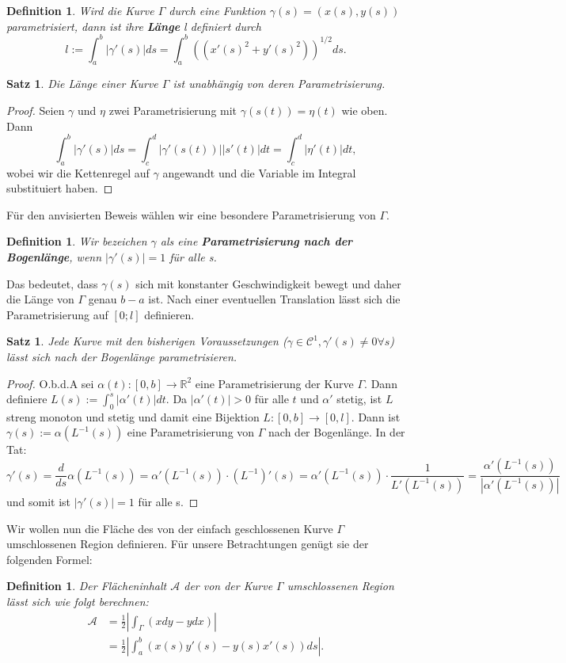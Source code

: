 \documentclass[12pt,a4paper]{article}
\theoremstyle{plain}
\newtheorem{Satz}[Theorem]{Satz}
\newtheorem{Definition}[Theorem]{Definition}
\newcommand{\herv}[1]{{\emph{\textbf{#1}}}}
\newcommand{\R}{\mathbb{R}}
\numberwithin{equation}{section}
\begin{document}
\begin{Definition}
Wird die Kurve $\Gamma$ durch eine Funktion $\gamma(s)=(x(s),y(s))$ parametrisiert, dann ist ihre \herv{Länge} l definiert durch \[
l:=\int_a^b{|\gamma'(s)|ds}=\int_a^b {\left((x'(s)^2+y'(s)^2)\right)^{1/2}ds}.\]
\end{Definition}
\begin{Satz}
Die Länge einer Kurve $\Gamma$ ist unabhängig von deren Parametrisierung.
\end{Satz}
\begin{proof}
Seien $\gamma$ und $\eta$ zwei Parametrisierung mit $\gamma(s(t))=\eta(t)$ wie oben. Dann \[ \int_a^b{|\gamma'(s)|ds} = \int_c^d{|\gamma'(s(t))||s'(t)|dt} = \int_c^d{|\eta'(t)|dt} ,\] wobei wir die Kettenregel auf $\gamma$ angewandt und die Variable im Integral substituiert haben.
\end{proof}
Für den anvisierten Beweis wählen wir eine besondere Parametrisierung von $\Gamma$.
\begin{Definition}
Wir bezeichen $\gamma$ als eine \herv{Parametrisierung nach der Bogenlänge}, wenn $|\gamma'(s)|=1$ für alle s.
\end{Definition}
Das bedeutet, dass $\gamma(s)$ sich mit konstanter Geschwindigkeit bewegt und daher die Länge von $\Gamma$ genau $b-a$ ist. Nach einer eventuellen Translation lässt sich die Parametrisierung auf $[0;l]$ definieren.
\begin{Satz}
Jede Kurve mit den bisherigen Voraussetzungen ($\gamma\in\mathcal{C}^1, \gamma'(s)\neq 0 \forall s$) lässt sich nach der Bogenlänge parametrisieren.
\end{Satz}
\begin{proof}
O.b.d.A sei $\alpha(t):[0,b]\rightarrow \R^2$ eine Parametrisierung der Kurve $\Gamma$. Dann definiere $L(s):=\int_0^s{|\alpha'(t)|dt}$. Da $|\alpha'(t)| > 0$ für alle $t$ und $\alpha'$ stetig, ist $L$ streng monoton und stetig und damit eine Bijektion $L:[0,b]\rightarrow [0,l]$. Dann ist $\gamma(s):=\alpha(L^{-1}(s))$ eine Parametrisierung von $\Gamma$ nach der Bogenlänge. In der Tat: \[\gamma'(s)=\frac{d}{ds}\alpha(L^{-1}(s))=\alpha'({L^{-1}(s)})\cdot (L^{-1})'(s) = \alpha'(L^{-1}(s))\cdot \frac{1}{L'(L^{-1}(s))}= \frac{\alpha'(L^{-1}(s))}{|\alpha'(L^{-1}(s))|}\] und somit ist $|\gamma'(s)|=1$ für alle s.
\end{proof}
Wir wollen nun die Fläche des von der einfach geschlossenen Kurve $\Gamma$ umschlossenen Region definieren. Für unsere Betrachtungen genügt sie der folgenden Formel:
\begin{Definition}
Der Flächeninhalt $\mathcal{A}$ der von der Kurve $\Gamma$ umschlossenen Region lässt sich wie folgt berechnen:
\begin{align*}
\mathcal{A}&=\frac{1}{2}\left|\int_\Gamma (x dy -y dx) \right| \\
&= \frac{1}{2}\left|\int_a^b (x(s)y'(s)-y(s)x'(s)) ds \right| .
\end{align*}
\end{Definition}
\end{document}
